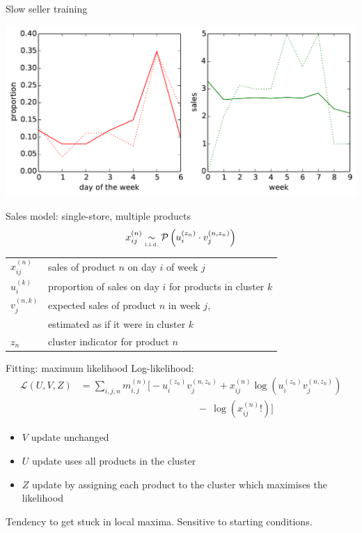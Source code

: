 \documentclass{beamer}
\begin{document}
\begin{frame}{Slow seller training}
  \begin{center}
  \includegraphics[width=0.8\columnwidth]{slow_learning.pdf}
 \end{center}
\end{frame}

\begin{frame}{Sales model: single-store, multiple products}
 \begin{equation}
  x_{ij}^{(n)} \underset{\text{\tiny i.i.d.}}{\sim} \mathcal{P}\left(u_i^{(z_n)} \cdot v_j^{(n,z_n)}\right)
 \end{equation}
 \begin{tabular}{ll}
  $x_{ij}^{(n)}$ & sales of product $n$ on day $i$ of week $j$ \\
  $u_i^{(k)}$    & proportion of sales on day $i$ for products in cluster $k$ \\
  $v_j^{(n,k)}$  & expected sales of product $n$ in week $j$, \\
                 & \qquad estimated as if it were in cluster $k$ \\
  $z_n$          & cluster indicator for product $n$
 \end{tabular}
\end{frame}

\begin{frame}{Fitting: maximum likelihood}
 Log-likelihood:
 \begin{align}
  \mathcal{L}(U,V,Z) &= \sum_{i,j,n} m_{i,j}^{(n)} \bigg[ -u_i^{(z_n)} v_j^{(n,z_n)} + x_{ij}^{(n)}\log(u_i^{(z_n)} v_j^{(n,z_n)}) \nonumber \\
  &\qquad\qquad\qquad\qquad\qquad\qquad -\: \log(x_{ij}^{(n)}!) \bigg]
 \end{align}
 
 \begin{itemize}
  \item $V$ update unchanged
  \item $U$ update uses all products in the cluster
  \item $Z$ update by assigning each product to the cluster which maximises the likelihood
 \end{itemize}
 Tendency to get stuck in local maxima. Sensitive to starting conditions.
\end{frame}
\end{document}

